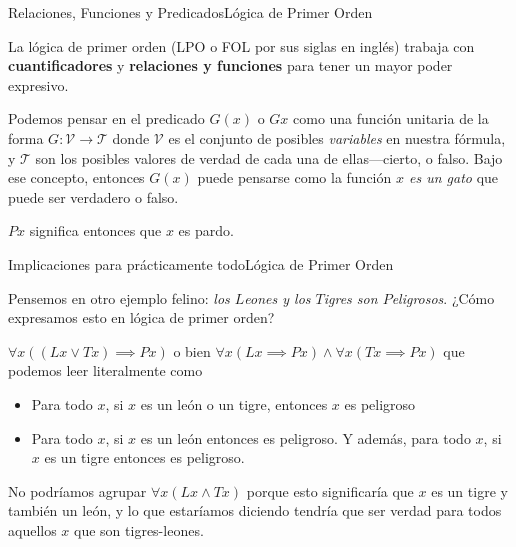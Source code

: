\documentclass[spanish, c]{beamer}
\begin{document}
\begin{frame}{Relaciones, Funciones y Predicados}{Lógica de Primer Orden}

    La \alert{lógica de primer orden} (LPO o FOL por sus siglas en inglés) trabaja con \textbf{cuantificadores} y \textbf{relaciones y funciones} para tener un mayor poder expresivo. \pause

    \bigskip

    Podemos pensar en el predicado $G(x)$ o $Gx$ como una función unitaria de la forma $G \colon \mathscr{V} \to \mathscr{T}$ donde $\mathscr{V}$ es el conjunto de posibles \textit{variables} en nuestra fórmula, y $\mathscr{T}$ son los posibles valores de verdad de cada una de ellas---cierto, o falso.
    Bajo ese concepto, entonces $G(x)$ puede pensarse como la función \textit{$x$ es un gato} que puede ser verdadero o falso. \pause

    $Px$ significa entonces que $x$ es pardo.
\end{frame}

\begin{frame}{Implicaciones para prácticamente todo}{Lógica de Primer Orden}
    
    Pensemos en otro ejemplo felino: \textit{los $L$eones y los $T$igres son $P$eligrosos}. ¿Cómo expresamos esto en lógica de primer orden?
    \pause
    
    $\forall x((Lx \vee Tx) \implies Px)$ o bien $\forall x(Lx \implies Px) \wedge \forall x(Tx \implies Px)$ que podemos leer literalmente como

    \begin{itemize}
        \item Para todo $x$, si $x$ es un león o un tigre, entonces $x$ es peligroso
        \item Para todo $x$, si $x$ es un león entonces es peligroso. Y además, para todo $x$, si $x$ es un tigre entonces es peligroso.
    \end{itemize} \pause

    No podríamos agrupar $\forall x (Lx \wedge Tx)$ porque esto significaría que $x$ es un tigre y también un león, y lo que estaríamos diciendo tendría que ser verdad para todos aquellos $x$ que son tigres-leones.
\end{frame}
\end{document}
